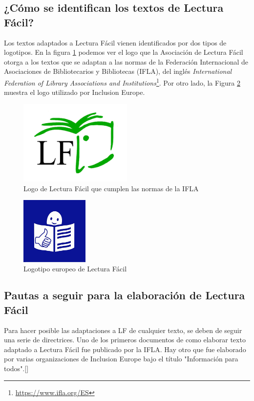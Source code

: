 \subsection{¿Cómo se identifican los textos de Lectura Fácil?}
Los textos adaptados a Lectura Fácil vienen identificados por dos tipos de logotipos. En la figura \ref{fig:IFLA} podemos ver el logo que la Asociación de Lectura Fácil otorga a los textos que se adaptan a las normas de la Federación Internacional de Asociaciones de Bibliotecarios y Bibliotecas (IFLA), del inglés \textit{International Federation of Library Associations and Institutions}\footnote{\href{https://www.ifla.org/ES}{https://www.ifla.org/ES}}. Por otro lado, la Figura  \ref{fig:logoEuropeo} muestra el logo utilizado por Inclusion Europe.
\begin{figure}[htb]
\centering
	\includegraphics[width=0.5\textwidth]{Imagenes/Logos/indice}
	\caption{Logo de Lectura Fácil que cumplen las normas de la IFLA}
	\label{fig:IFLA}
\end{figure} 
\begin{figure}[htb]
	\centering
	\includegraphics[width=0.3\textwidth]{Imagenes/Logos/indice2}
	\caption{Logotipo europeo de Lectura Fácil}
	\label{fig:logoEuropeo}
\end{figure} 

\subsection{Pautas a seguir para la elaboración de Lectura Fácil}
Para hacer posible las adaptaciones a LF de cualquier texto, se deben de seguir una serie de directrices. Uno de los primeros documentos de como elaborar texto adaptado a Lectura Fácil fue publicado por la IFLA. Hay otro que fue elaborado por varias organizaciones de Inclusion Europe bajo el título "Información para todos".[\cite{InformacionParaTodos}]


